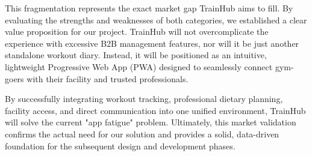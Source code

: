This fragmentation represents the exact market gap TrainHub aims to fill. By evaluating the strengths and weaknesses of both categories, we established a clear value proposition for our project. TrainHub will not overcomplicate the experience with excessive B2B management features, nor will it be just another standalone workout diary. Instead, it will be positioned as an intuitive, lightweight Progressive Web App (PWA) designed to seamlessly connect gym-goers with their facility and trusted professionals.

By successfully integrating workout tracking, professional dietary planning, facility access, and direct communication into one unified environment, TrainHub will solve the current "app fatigue" problem. Ultimately, this market validation confirms the actual need for our solution and provides a solid, data-driven foundation for the subsequent design and development phases.
